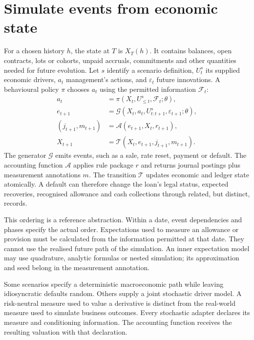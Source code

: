 \section{Simulate events from economic state}

For a chosen history $h$, the state at $T$ is $X_T(h)$. It contains balances,
open contracts, lots or cohorts, unpaid accruals, commitments and other
quantities needed for future evolution. Let $s$ identify a scenario definition,
$U_t^s$ its supplied economic drivers, $a_t$ management's actions, and
$\varepsilon_t$ future innovations. A behavioural policy $\pi$ chooses
$a_t$ using the permitted information $\mathcal{F}_t$:
\begin{align}
 a_t&=\pi(X_t,U_{\leq t}^s,\mathcal{F}_t;\theta),\label{eq:actions}\\
 e_{t+1}&=\mathcal G(X_t,a_t,U_{t:t+1}^s,\varepsilon_{t+1};\theta),\label{eq:events}\\
 (j_{t+1},m_{t+1})&=\mathcal A(e_{t+1},X_t,r_{t+1}),\label{eq:account}\\
 X_{t+1}&=\mathcal T(X_t,e_{t+1},j_{t+1},m_{t+1}).\label{eq:transition}
\end{align}
The generator $\mathcal G$ emits events, such as a sale, rate reset, payment or default.
The accounting function $\mathcal A$ applies rule package $r$ and returns journal
postings plus measurement annotations $m$. The transition $\mathcal T$ updates economic
and ledger state atomically. A default can therefore change the loan's legal
status, expected recoveries, recognised allowance and cash collections through
related, but distinct, records.

This ordering is a reference abstraction. Within a date, event dependencies
and phases specify the actual order. Expectations used to measure an allowance
or provision must be calculated from the information permitted at that date.
They cannot use the realised future path of the simulation. An inner
expectation model may use quadrature, analytic formulas or nested simulation;
its approximation and seed belong in the measurement annotation.

Some scenarios specify a deterministic macroeconomic path while leaving
idiosyncratic defaults random. Others supply a joint stochastic driver model.
A risk-neutral measure used to value a derivative is distinct from the
real-world measure used to simulate business outcomes. Every stochastic
adapter declares its measure and conditioning information. The accounting
function receives the resulting valuation with that declaration.

